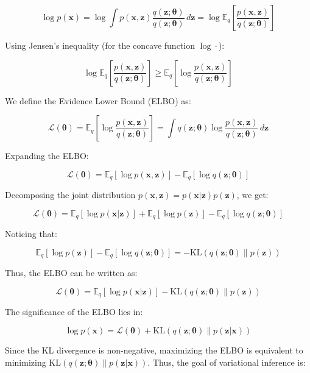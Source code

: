 \documentclass[10pt]{elegantbook}
\begin{document}
\[
\log p(\mathbf{x}) = \log \int p(\mathbf{x}, \mathbf{z}) \frac{q(\mathbf{z}; \boldsymbol{\theta})}{q(\mathbf{z}; \boldsymbol{\theta})} \, d\mathbf{z} = \log \mathbb{E}_q \left[ \frac{p(\mathbf{x}, \mathbf{z})}{q(\mathbf{z}; \boldsymbol{\theta})} \right]
\]

Using Jensen’s inequality (for the concave function \( \log \cdot \)):

\[
\log \mathbb{E}_q \left[ \frac{p(\mathbf{x}, \mathbf{z})}{q(\mathbf{z}; \boldsymbol{\theta})} \right] \geq \mathbb{E}_q \left[ \log \frac{p(\mathbf{x}, \mathbf{z})}{q(\mathbf{z}; \boldsymbol{\theta})} \right]
\]

We define the Evidence Lower Bound (ELBO) as:

\[
\mathcal{L}(\boldsymbol{\theta}) = \mathbb{E}_q \left[ \log \frac{p(\mathbf{x}, \mathbf{z})}{q(\mathbf{z}; \boldsymbol{\theta})} \right] = \int q(\mathbf{z}; \boldsymbol{\theta}) \log \frac{p(\mathbf{x}, \mathbf{z})}{q(\mathbf{z}; \boldsymbol{\theta})} \, d\mathbf{z}
\]

Expanding the ELBO:

\[
\mathcal{L}(\boldsymbol{\theta}) = \mathbb{E}_q [\log p(\mathbf{x}, \mathbf{z})] - \mathbb{E}_q [\log q(\mathbf{z}; \boldsymbol{\theta})]
\]

Decomposing the joint distribution \( p(\mathbf{x}, \mathbf{z}) = p(\mathbf{x} | \mathbf{z}) p(\mathbf{z}) \), we get:

\[
\mathcal{L}(\boldsymbol{\theta}) = \mathbb{E}_q [\log p(\mathbf{x} | \mathbf{z})] + \mathbb{E}_q [\log p(\mathbf{z})] - \mathbb{E}_q [\log q(\mathbf{z}; \boldsymbol{\theta})]
\]

Noticing that:

\[
\mathbb{E}_q [\log p(\mathbf{z})] - \mathbb{E}_q [\log q(\mathbf{z}; \boldsymbol{\theta})] = -\text{KL}(q(\mathbf{z}; \boldsymbol{\theta}) \| p(\mathbf{z}))
\]

Thus, the ELBO can be written as:

\[
\mathcal{L}(\boldsymbol{\theta}) = \mathbb{E}_q [\log p(\mathbf{x} | \mathbf{z})] - \text{KL}(q(\mathbf{z}; \boldsymbol{\theta}) \| p(\mathbf{z}))
\]

The significance of the ELBO lies in:

\[
\log p(\mathbf{x}) = \mathcal{L}(\boldsymbol{\theta}) + \text{KL}(q(\mathbf{z}; \boldsymbol{\theta}) \| p(\mathbf{z} | \mathbf{x}))
\]

Since the KL divergence is non-negative, maximizing the ELBO is equivalent to minimizing \( \text{KL}(q(\mathbf{z}; \boldsymbol{\theta}) \| p(\mathbf{z} | \mathbf{x})) \). Thus, the goal of variational inference is:
\end{document}

